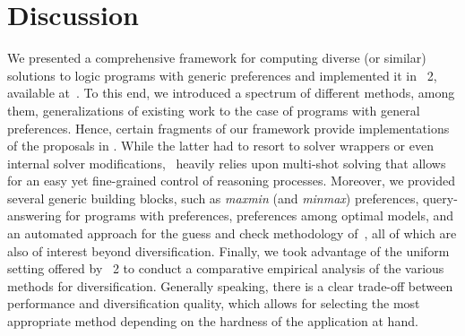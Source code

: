 
\section{Discussion}\label{sec:discussion}

We presented a comprehensive framework for computing diverse (or similar) solutions to logic programs with generic preferences
and implemented it in \asprin~2, available at~\cite{asprin}. %
To this end, we introduced a spectrum of different methods, among them, generalizations of existing work to the case of
programs with general preferences.
Hence, certain fragments of our framework provide implementations of the proposals in \cite{eiererfi13a,zhutru13a}.
While the latter had to resort to solver wrappers or even internal solver modifications,
\asprin\ heavily relies upon multi-shot solving that allows for an easy yet fine-grained control of reasoning processes.
Moreover, we provided several generic building blocks, such as 
\textit{maxmin} (and \textit{minmax}) preferences,
query-answering for programs with preferences,
preferences among optimal models,
and an automated approach for the guess and check methodology of~\cite{eitpol06a},
all of which are also of interest beyond diversification.
%
Finally, we took advantage of the uniform setting offered by \asprin~2 to conduct a 
comparative empirical analysis of the various methods for diversification.
Generally speaking,
there is a clear trade-off between performance and diversification quality, 
which allows for selecting the most appropriate method 
depending on the hardness of the application at hand.



